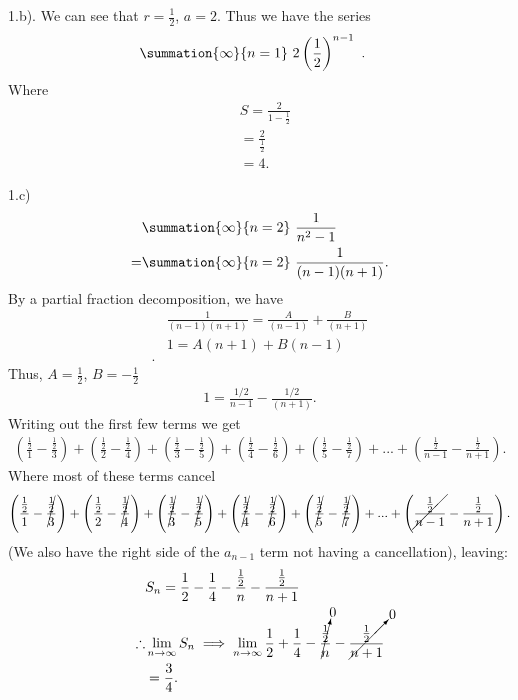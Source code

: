 \documentclass{report}
\begin{document}
    \bigbreak \noindent 
    1.b). We can see that $r=\frac{1}{2}$, $a=2$. Thus we have the series
    \begin{align*}
        &\summation{\infty}{n=1}\ 2\left(\frac{1}{2}\right)^{n-1}\ 
    .\end{align*}
    Where 
    \begin{align*}
        &S = \frac{2}{1-\frac{1}{2}} \\
        &= \frac{2}{\frac{1}{2}} \\
        &= 4
    .\end{align*}

    \pagebreak \bigbreak \noindent 
    1.c)
    \begin{align*}
          &\summation{\infty}{n=2}\ \frac{1}{n^{2} - 1} \\
          =&\summation{\infty}{n=2}\ \frac{1}{(n-1)(n+1)} 
    .\end{align*}
    By a partial fraction decomposition, we have
    \begin{align*}
        &\frac{1}{(n-1)(n+1)} = \frac{A}{(n-1)} + \frac{B}{(n+1)} \\
        &1 = A(n+1) + B(n-1) \\
    .\end{align*}
    \bigbreak \noindent 
    Thus, $A=\frac{1}{2}$, $B=-\frac{1}{2}$
    \begin{align*}
        1 = \frac{1/2}{n-1} - \frac{1/2}{(n+1)}
    .\end{align*}
    Writing out the first few terms we get 
    \begin{align*}
        \left(\frac{\frac{1}{2}}{1}-\frac{\frac{1}{2}}{3}\right) + \left(\frac{\frac{1}{2}}{2} - \frac{\frac{1}{2}}{4}\right)  +\left(\frac{\frac{1}{2}}{3} - \frac{\frac{1}{2}}{5}\right) + \left(\frac{\frac{1}{2}}{4} -\frac{\frac{1}{2}}{6}\right) + \left(\frac{\frac{1}{2}}{5} - \frac{\frac{1}{2}}{7}\right) + ... + \left(\frac{\frac{1}{2}}{n-1} - \frac{\frac{1}{2}}{n+1}\right)
    .\end{align*}
    Where most of these terms cancel 
    \begin{align*}
        \left(\frac{\frac{1}{2}}{1}-\cancel{\frac{\frac{1}{2}}{3}}\right) + \left(\frac{\frac{1}{2}}{2} - \cancel{\frac{\frac{1}{2}}{4}}\right)  +\left(\cancel{\frac{\frac{1}{2}}{3}} - \cancel{\frac{\frac{1}{2}}{5}}\right) + \left(\cancel{\frac{\frac{1}{2}}{4}} -\cancel{\frac{\frac{1}{2}}{6}}\right) + \left(\cancel{\frac{\frac{1}{2}}{5}} - \cancel{\frac{\frac{1}{2}}{7}}\right) + ... + \left(\cancel{\frac{\frac{1}{2}}{n-1}} - \frac{\frac{1}{2}}{n+1}\right)
    .\end{align*}
    \bigbreak \noindent 
    (We also have the right side of the $a_{n-1}$ term not having a cancellation), leaving:
    \begin{align*}
        &S_{n} = \frac{1}{2} - \frac{1}{4}- \frac{\frac{1}{2}}{n} - \frac{\frac{1}{2}}{n+1} \\
        \therefore&\lim\limits_{n \to \infty}{S_{n}} \implies \lim\limits_{n \to \infty}{\frac{1}{2}+\frac{1}{4}-\cancelto{0}{\frac{\frac{1}{2}}{n}}- \cancelto{0}{\frac{\frac{1}{2}}{n+1}}} \\
        &=\frac{3}{4}
    .\end{align*}
\end{document}

